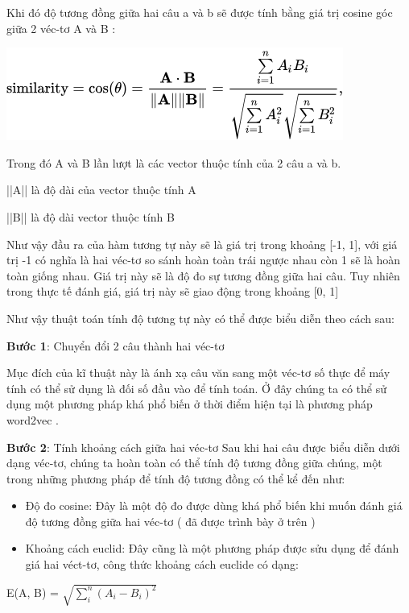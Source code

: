 \documentclass[12pt]{report}
\begin{document}
Khi đó độ tương đồng giữa hai câu a và b sẽ được tính bằng giá trị cosine góc giữa 2 véc-tơ A và B :

\begin{center}
	\includegraphics[width=0.7\linewidth]{similarity}
\end{center}
\hspace{20mm}Trong đó A và B lần lượt là các vector thuộc tính của 2 câu a và b. 

\hspace{20mm}||A|| là độ dài của vector thuộc tính A

\hspace{20mm}||B|| là độ dài vector thuộc tính B

Như vậy đầu ra của hàm tương tự này sẽ là giá trị trong khoảng [-1, 1], với giá trị -1 có nghĩa là hai véc-tơ so sánh hoàn toàn trái ngược nhau còn 1 sẽ là hoàn toàn giống nhau. Giá trị này sẽ là độ đo sự tương đồng giữa hai câu. Tuy nhiên trong thực tế đánh giá, giá trị này sẽ giao động trong khoảng [0, 1] 

Như vậy thuật toán tính độ tương tự này có thể được biểu diễn theo cách sau:

\textbf{Bước 1}: Chuyển đổi 2 câu thành hai véc-tơ

Mục đích của kĩ thuật này là ánh xạ câu văn sang một véc-tơ số thực để máy tính có thể sử dụng là đối số đầu vào để tính toán. Ở đây chúng ta có thể sử dụng một phương pháp khá phổ biến ở thời điểm hiện tại là phương pháp word2vec \cite{cia-word2vec}.

\textbf{Bước 2}: Tính khoảng cách giữa hai véc-tơ
Sau khi hai câu được biểu diễn dưới dạng véc-tơ, chúng ta hoàn toàn có thể tính độ tương đồng giữa chúng, một trong những phương pháp để tính độ tương đồng có thể kể đến như:
\begin{itemize}
	\item Độ đo cosine: Đây là một độ đo được dùng khá phổ biến khi muốn đánh giá độ tương đồng giữa hai véc-tơ ( đã được trình bày ở trên )
	\item Khoảng cách euclid: Đây cũng là một phương pháp được sửu dụng để đánh giá hai véct-tơ, công thức khoảng cách euclide \cite{cia-euclid} có dạng:
\end{itemize}
\begin{center}
	E(A, B) = $\sqrt{\sum_{i}^{n} (A_i - B_i) ^2}$
\end{center}
\end{document}
